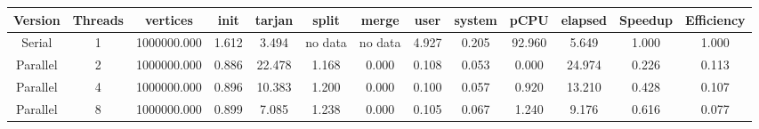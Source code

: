 \begin{tabular}{|c|c|c|c|c|c|c|c|c|c|c|c|c|}
\toprule
 Version &  Threads &    vertices &  init &  tarjan &   split &   merge &  user &  system &   pCPU &  elapsed &  Speedup &  Efficiency \\
\midrule
  Serial &        1 & 1000000.000 & 1.612 &   3.494 & no data & no data & 4.927 &   0.205 & 92.960 &    5.649 &    1.000 &       1.000 \\
Parallel &        2 & 1000000.000 & 0.886 &  22.478 &   1.168 &   0.000 & 0.108 &   0.053 &  0.000 &   24.974 &    0.226 &       0.113 \\
Parallel &        4 & 1000000.000 & 0.896 &  10.383 &   1.200 &   0.000 & 0.100 &   0.057 &  0.920 &   13.210 &    0.428 &       0.107 \\
Parallel &        8 & 1000000.000 & 0.899 &   7.085 &   1.238 &   0.000 & 0.105 &   0.067 &  1.240 &    9.176 &    0.616 &       0.077 \\
\bottomrule
\end{tabular}
